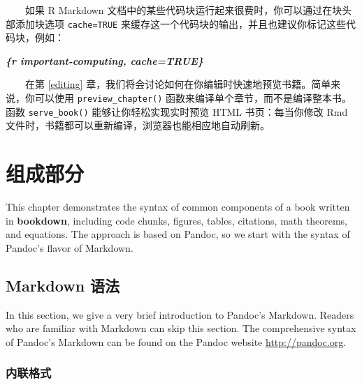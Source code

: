 \documentclass[
  12pt,
]{krantz}
\newenvironment{Shaded}{\begin{snugshade}}{\end{snugshade}}
\newcommand{\InformationTok}[1]{\textcolor[rgb]{0.56,0.35,0.01}{\textbf{\textit{#1}}}}
\theoremstyle{definition}
\theoremstyle{definition}
\theoremstyle{definition}
\theoremstyle{definition}
\theoremstyle{remark}
\begin{document}
  如果 R Markdown 文档中的某些代码块运行起来很费时，你可以通过在块头部添加块选项 \texttt{cache=TRUE} 来缓存这一个代码块的输出，并且也建议你标记这些代码块，例如：

\begin{Shaded}
\begin{Highlighting}[]
\InformationTok{\textasciigrave{}\textasciigrave{}\textasciigrave{}\{r important{-}computing, cache=TRUE\}}
\end{Highlighting}
\end{Shaded}

  在第 \ref{editing} 章，我们将会讨论如何在你编辑时快速地预览书籍。简单来说，你可以使用 \texttt{preview\_chapter()} 函数来编译单个章节，而不是编译整本书。函数 \texttt{serve\_book()} 能够让你轻松实现实时预览 HTML 书页：每当你修改 Rmd 文件时，书籍都可以重新编译，浏览器也能相应地自动刷新。

\hypertarget{components}{%
\chapter{组成部分}\label{components}}

This chapter demonstrates the syntax of common components of a book written in \textbf{bookdown}, including code chunks, figures, tables, citations, math theorems, and equations. The approach is based on Pandoc, so we start with the syntax of Pandoc's flavor of Markdown.

\hypertarget{markdown-syntax}{%
\section{Markdown 语法}\label{markdown-syntax}}

In this section, we give a very brief introduction to Pandoc's Markdown. Readers who are familiar with Markdown can skip this section. The comprehensive syntax of Pandoc's Markdown can be found on the Pandoc website \url{http://pandoc.org}.

\hypertarget{ux5185ux8054ux683cux5f0f}{%
\subsection{内联格式}\label{ux5185ux8054ux683cux5f0f}}
\end{document}

